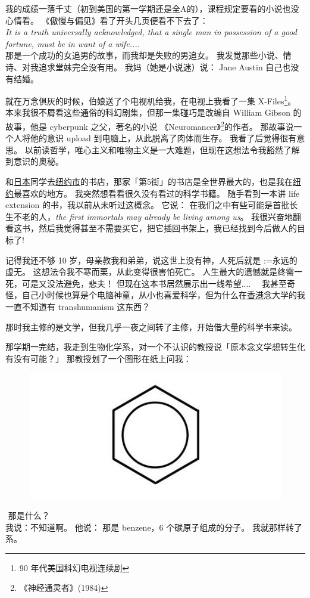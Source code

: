\documentclass[12pt]{report}
\makeatletter
\newcommand{\tab}{\hspace*{1cm}}
\renewcommand{\d}[1]{$\underaccent{\scalebox{0.5}{\textbullet}}{\textrm{#1}}$}
\newcommand{\ds}[1]{%
  \@tfor\next:=#1\do{\d{\next}}}
\newcommand*\dashh{\textemdash\,\,}
\makeatother
\begin{document}
我的成绩一落千丈（初到美国的第一学期还是全A的），课程规定要看的小说也没心情看。 《傲慢与偏见》看了开头几页便看不下去了： \\
\textit{It is a truth universally acknowledged, that a single man in possession of a good fortune, must be in want of a wife....} \\
那是一个成功的女追男的故事，而我却是失败的男追女。 我发觉那些小说、情诗、对我追求堂妹完全没有用。 我妈（她是小说迷）说： Jane Austin 自己也没有结婚。

就在万念俱灰的时候，伯娘送了个电视机给我，在电视上我看了一集 X-Files\footnote{90 年代美国科幻电视连续剧}。 本来我很不屑看这些通俗的科幻剧集，但那一集碰巧是改编自 William Gibson 的故事，他是 cyberpunk 之父，著名的小说 《Neuromancer》\footnote{《神经通灵者》(1984)}的作者。 那故事说一个人将他的意识 upload 到电脑上，从此脱离了肉体而生存。 我看了后觉得很有意思。 以前读哲学，唯心主义和唯物主义是一大难题，但现在这想法令我豁然了解到意识的奥秘。 

和\uline{日本}同学去\uline{纽约市}的书店，那家「第5街」的书店是全世界最大的，也是我在\uline{纽约}最喜欢的地方。 我突然想看看很久没有看过的科学书籍。 随手看到一本讲 life extension 的书，我以前从未听过这概念。 它说： 在我们之中有些可能是首批长生不老的人，\textit{the first immortals may already be living among us}。 我很兴奋地翻看这书，然后我觉得甚至不需要买它，把它插回书架上，我已经找到今后做人的目标了!

记得我还不够 10 岁，母亲教我和弟弟，说这世上没有神，人死后就是\ds{永远的虚无}。 这想法令我不寒而栗，从此变得很害怕死亡。 人生最大的遗憾就是终需一死，可是又没法避免，悲夫！  但现在这本书居然展示出一线希望....~~  我甚至奇怪，自己小时候也算是个电脑神童，从小也喜爱科学，但为什么在\uline{香港}念大学的我一直不知道有 transhumanism 这东西？

那时我主修的是文学，但我几乎一夜之间转了主修，开始借大量的科学书来读。

那学期一完结，我走到生物化学系，对一个不认识的教授说「原本念文学想转生化有没有可能？」 那教授划了一个图形在纸上问我：
\begin{figure}[H]
\centering
\includegraphics[scale=0.4]{benzene.jpg}
\end{figure}
\vspace{-1cm}
\tab \dashh 那是什么？\\
我说：不知道啊。 他说： 那是 benzene，6 个碳原子组成的分子。  我就那样转了系。
\end{document}
